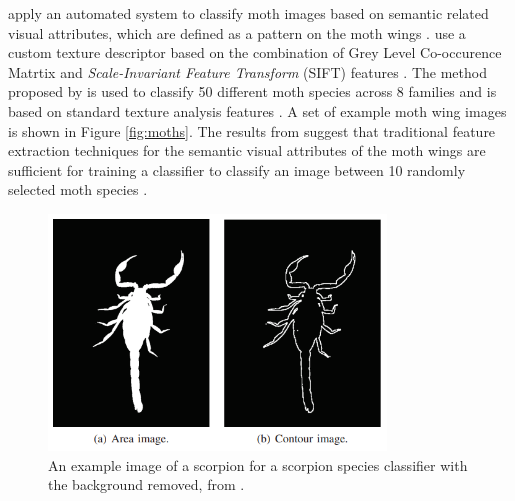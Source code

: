 \documentclass[12pt]{article}
\begin{document}
\citeauthor*{feng_automated_2013} apply an automated system to classify moth
images based on semantic related visual attributes, which are defined as a
pattern on the moth wings \cite{feng_automated_2013}.
\citeauthor*{feng_automated_2013} use a custom texture descriptor based on the
combination of Grey Level Co-occurence Matrtix and \textit{Scale-Invariant
    Feature Transform} (SIFT) features \cite{gotlieb_texture_1990,
    lowe_distinctive_2004}. The method proposed by \citeauthor*{feng_automated_2013}
is used to classify 50 different moth species across 8 families and is based on
standard texture analysis features \cite{feng_automated_2013}. A set of example
moth wing images is shown in Figure \ref{fig:moths}. The results from
\citeauthor*{feng_automated_2013} suggest that traditional feature extraction
techniques for the semantic visual attributes of the moth wings are
sufficient for training a classifier to classify an image between 10 randomly
selected moth species \cite{feng_automated_2013}.

\begin{figure}[h]
    \centering
    \includegraphics[width=0.8\textwidth]{assets/images/scorpions.png}
    \caption{An example image of a scorpion for a scorpion species classifier
        with the background removed, from \citeauthor*{urteaga_scorpions_2016}
        \cite{urteaga_scorpions_2016}.}
    \label{fig:scorpions}
\end{figure}
\end{document}
